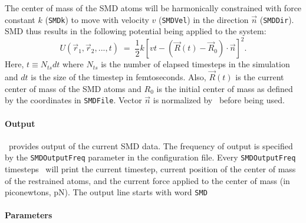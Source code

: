 The center of mass of the SMD atoms will be harmonically constrained with 
force constant $k$ ({\tt SMDk}) to move with velocity $v$ ({\tt SMDVel}) in 
the direction $\vec n$ ({\tt SMDDir}).  SMD thus results in the following
potential being applied to the system:
\begin{equation}
\label{eq:SMDpotential}
U(\vec r_1, \vec r_2, ..., t) \; = \; \frac{1}{2} 
  k\left[vt - (\vec R(t) - \vec R_0)\cdot \vec n \right]^2.
\end{equation}
Here, $t \equiv N_{ts} dt$ where $N_{ts}$ is the number of elapsed timesteps
in the simulation and $dt$ is the size of the timestep in femtoseconds.
Also, $\vec R(t)$ is the current center of mass of the SMD atoms and $R_0$ is
the initial center of mass as defined by the coordinates in {\tt SMDFile}.
Vector $\vec n$ is normalized by \NAMD\ before being used.  

\paragraph*{Output}

\NAMD\ provides output of the current SMD data. The frequency of
output is specified by the {\tt SMDOutputFreq} parameter in the
configuration file. Every {\tt SMDOutputFreq} timesteps \NAMD\ will
print the current timestep, current position of the center of mass of the
restrained atoms, and
the current force applied to the center of mass (in piconewtons, pN).
The output line starts with word {\tt SMD}

\paragraph*{Parameters}

